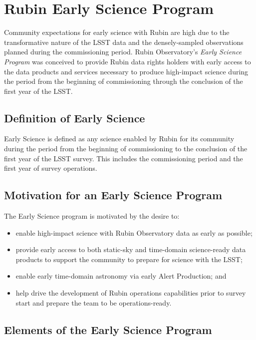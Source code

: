 \section{Rubin Early Science Program}

Community expectations for early science with Rubin are high due to the transformative nature of the LSST data and the densely-sampled observations planned during the commissioning period.
Rubin Observatory's \emph{Early Science Program} was conceived to provide Rubin data rights holders with early access to the data products and services necessary to produce high-impact science during the period from the beginning of commissioning through the conclusion of the first year of the LSST.

\subsection{Definition of Early Science}
\label{ssec:defn}
Early Science is defined as any science enabled by Rubin for its community during the period from the beginning of commissioning to the conclusion of the first year of the LSST survey.
This includes the commissioning period and the first year of survey operations.

\subsection{Motivation for an Early Science Program}  \label{ssec:motivation}

The Early Science program is motivated by the desire to:
\begin{itemize}
\item enable high-impact science with Rubin Observatory data as early as possible;
\item provide early access to both static-sky and time-domain science-ready data products to support the community to prepare for science with the LSST;
\item enable early time-domain astronomy via early Alert Production; and
\item help drive the development of Rubin operations capabilities prior to survey start and prepare the team to be operations-ready.
\end{itemize}

\subsection{Elements of the Early Science Program}

